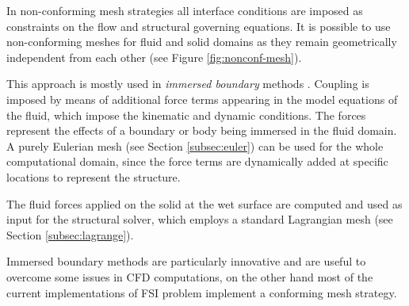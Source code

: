 In non-conforming mesh strategies all interface conditions are imposed as constraints on the flow and structural governing equations. It is possible to use non-conforming meshes for fluid and solid domains as they remain geometrically independent from each other (see Figure \ref{fig:nonconf-mesh}).

This approach is mostly used in \textit{immersed boundary} methods \cite{kajishima2017immersed}. Coupling is imposed by means of additional force terms appearing in the model equations of the fluid, which impose the kinematic and dynamic conditions.
The forces represent the effects of a boundary or body being immersed in the fluid domain. A purely Eulerian mesh (see Section \ref{subsec:euler}) can be used for the whole computational domain, since
the force terms are dynamically added at specific locations to represent the structure.

The fluid forces applied on the solid at the wet surface are computed and used as input for the structural solver, which employs a standard Lagrangian mesh (see Section \ref{subsec:lagrange}).

Immersed boundary methods are particularly innovative and are useful to overcome some issues in CFD computations, on the other hand most of the current implementations of FSI problem implement a conforming mesh strategy.

